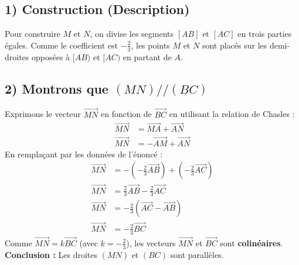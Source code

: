 \documentclass{article}
\begin{document}
\subsection*{1) Construction (Description)}
\noindent Pour construire $M$ et $N$, on divise les segments $[AB]$ et $[AC]$ en trois parties égales. Comme le coefficient est $-\frac{2}{3}$, les points $M$ et $N$ sont placés sur les demi-droites opposées à $[AB)$ et $[AC)$ en partant de $A$.

\vspace{1em}

\subsection*{2) Montrons que $(MN) // (BC)$}
\noindent Exprimons le vecteur $\overrightarrow{MN}$ en fonction de $\overrightarrow{BC}$ en utilisant la relation de Chasles :
\begin{align*}
\overrightarrow{MN} &= \overrightarrow{MA} + \overrightarrow{AN} \\
\overrightarrow{MN} &= -\overrightarrow{AM} + \overrightarrow{AN}
\end{align*}
\noindent En remplaçant par les données de l'énoncé :
\begin{align*}
\overrightarrow{MN} &= -\left( -\frac{2}{3}\overrightarrow{AB} \right) + \left( -\frac{2}{3}\overrightarrow{AC} \right) \\
\overrightarrow{MN} &= \frac{2}{3}\overrightarrow{AB} - \frac{2}{3}\overrightarrow{AC} \\
\overrightarrow{MN} &= -\frac{2}{3}(\overrightarrow{AC} - \overrightarrow{AB}) \\
\overrightarrow{MN} &= -\frac{2}{3}\overrightarrow{BC}
\end{align*}
\noindent Comme $\overrightarrow{MN} = k\overrightarrow{BC}$ (avec $k = -\frac{2}{3}$), les vecteurs $\overrightarrow{MN}$ et $\overrightarrow{BC}$ sont \textbf{colinéaires}. \\
\textbf{Conclusion :} Les droites $(MN)$ et $(BC)$ sont parallèles.

\vspace{1em}
\end{document}
